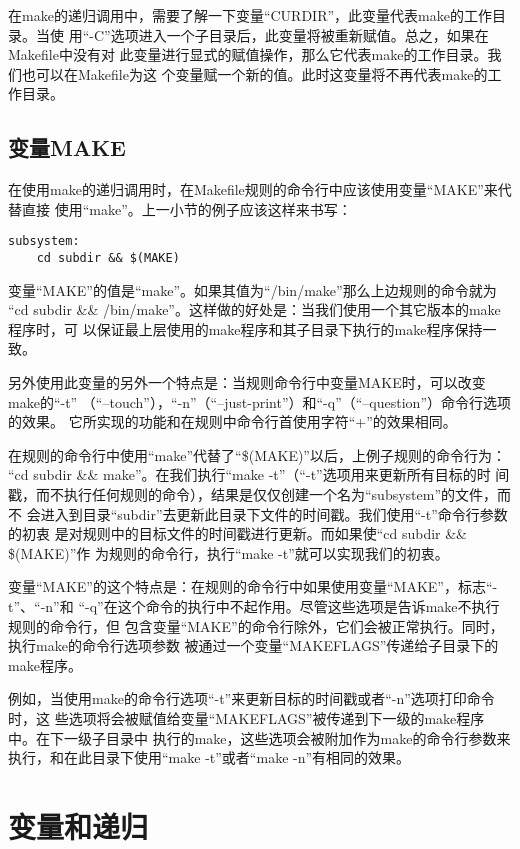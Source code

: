 在make的递归调用中，需要了解一下变量“CURDIR”，此变量代表make的工作目录。当使
用“-C”选项进入一个子目录后，此变量将被重新赋值。总之，如果在Makefile中没有对
此变量进行显式的赋值操作，那么它代表make的工作目录。我们也可以在Makefile为这
个变量赋一个新的值。此时这变量将不再代表make的工作目录。

\subsection{变量MAKE}
在使用make的递归调用时，在Makefile规则的命令行中应该使用变量“MAKE”来代替直接
使用“make”。上一小节的例子应该这样来书写：
\begin{Verbatim}[]
subsystem:
    cd subdir && $(MAKE)
\end{Verbatim}

变量“MAKE”的值是“make”。如果其值为“/bin/make”那么上边规则的命令就为
“cd subdir \&\& /bin/make”。这样做的好处是：当我们使用一个其它版本的make程序时，可
以保证最上层使用的make程序和其子目录下执行的make程序保持一致。

另外使用此变量的另外一个特点是：当规则命令行中变量MAKE时，可以改变make的“-t”
（“--touch”），“-n”（“--just-print”）和“-q”（“--question”）命令行选项的效果。
它所实现的功能和在规则中命令行首使用字符“+”的效果相同。

在规则的命令行中使用“make”代替了“\$(MAKE)”以后，上例子规则的命令行为：
“cd subdir \&\& make”。在我们执行“make -t”（“-t”选项用来更新所有目标的时
间戳，而不执行任何规则的命令），结果是仅仅创建一个名为“subsystem”的文件，而不
会进入到目录“subdir”去更新此目录下文件的时间戳。我们使用“-t”命令行参数的初衷
是对规则中的目标文件的时间戳进行更新。而如果使“cd subdir \&\& \$(MAKE)”作
为规则的命令行，执行“make -t”就可以实现我们的初衷。

变量“MAKE”的这个特点是：在规则的命令行中如果使用变量“MAKE”，标志“-t”、“-n”和
“-q”在这个命令的执行中不起作用。尽管这些选项是告诉make不执行规则的命令行，但
包含变量“MAKE”的命令行除外，它们会被正常执行。同时，执行make的命令行选项参数
被通过一个变量“MAKEFLAGS”传递给子目录下的make程序。

例如，当使用make的命令行选项“-t”来更新目标的时间戳或者“-n”选项打印命令时，这
些选项将会被赋值给变量“MAKEFLAGS”被传递到下一级的make程序中。在下一级子目录中
执行的make，这些选项会被附加作为make的命令行参数来执行，和在此目录下使用“make
-t”或者“make -n”有相同的效果。

\section{变量和递归}

